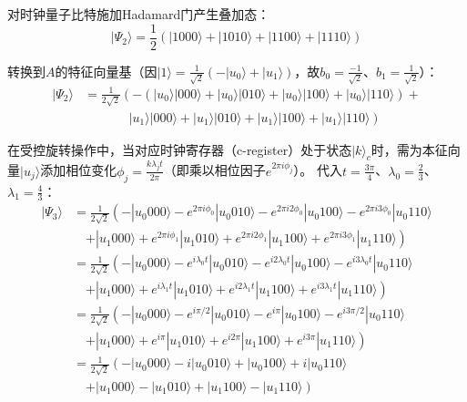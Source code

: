 \documentclass{article}
\begin{document}
对时钟量子比特施加Hadamard门产生叠加态：
\[
|\Psi_2\rangle = \frac{1}{2}(|1000\rangle + |1010\rangle + |1100\rangle + |1110\rangle)
\]

转换到\(A\)的特征向量基（因\(|1\rangle = \frac{1}{\sqrt{2}}(-|u_0\rangle + |u_1\rangle)\)，故\(b_0 = \frac{-1}{\sqrt{2}}\)、\(b_1 = \frac{1}{\sqrt{2}}\)）：
\[
\begin{aligned}
|\Psi_2\rangle &= \frac{1}{2\sqrt{2}}\left( -\left(|u_0\rangle|000\rangle + |u_0\rangle|010\rangle + |u_0\rangle|100\rangle + |u_0\rangle|110\rangle\right) + \right. \\
&\quad \left. \phantom{-\left( \right)} |u_1\rangle|000\rangle + |u_1\rangle|010\rangle + |u_1\rangle|100\rangle + |u_1\rangle|110\rangle \right)
\end{aligned}
\]

在受控旋转操作中，当对应时钟寄存器（c-register）处于状态\(|k\rangle_c\)时，需为本征向量\(|u_j\rangle\)添加相位变化\(\phi_j = \frac{k\lambda_j t}{2\pi}\)（即乘以相位因子\(e^{2\pi i\phi_j}\)）。
代入\(t = \frac{3\pi}{4}\)、\(\lambda_0 = \frac{2}{3}\)、\(\lambda_1 = \frac{4}{3}\)：
\[
\begin{aligned}
|\Psi_3\rangle &= \frac{1}{2\sqrt{2}} \left( -|u_{0}000\rangle - e^{2\pi i\phi_0}|u_{0}010\rangle - e^{2\pi i2\phi_0}|u_{0}100\rangle - e^{2\pi i3\phi_0}|u_{0}110\rangle \right. \\
&\quad \left. + |u_{1}000\rangle + e^{2\pi i\phi_1}|u_{1}010\rangle + e^{2\pi i2\phi_1}|u_{1}100\rangle + e^{2\pi i3\phi_1}|u_{1}110\rangle \right) \\
&= \frac{1}{2\sqrt{2}} \left( -|u_{0}000\rangle - e^{i\lambda_0 t}|u_{0}010\rangle - e^{i2\lambda_0 t}|u_{0}100\rangle - e^{i3\lambda_0 t}|u_{0}110\rangle \right. \\
&\quad \left. + |u_{1}000\rangle + e^{i\lambda_1 t}|u_{1}010\rangle + e^{i2\lambda_1 t}|u_{1}100\rangle + e^{i3\lambda_1 t}|u_{1}110\rangle \right) \\
&= \frac{1}{2\sqrt{2}} \left( -|u_{0}000\rangle - e^{i\pi/2}|u_{0}010\rangle - e^{i\pi}|u_{0}100\rangle - e^{i3\pi/2}|u_{0}110\rangle \right. \\
&\quad \left. + |u_{1}000\rangle + e^{i\pi}|u_{1}010\rangle + e^{i2\pi}|u_{1}100\rangle + e^{i3\pi}|u_{1}110\rangle \right) \\
&= \frac{1}{2\sqrt{2}} \left( -|u_{0}000\rangle - i|u_{0}010\rangle + |u_{0}100\rangle + i|u_{0}110\rangle \right. \\
&\quad \left. + |u_{1}000\rangle - |u_{1}010\rangle + |u_{1}100\rangle - |u_{1}110\rangle \right)
\end{aligned}
\]
\end{document}
